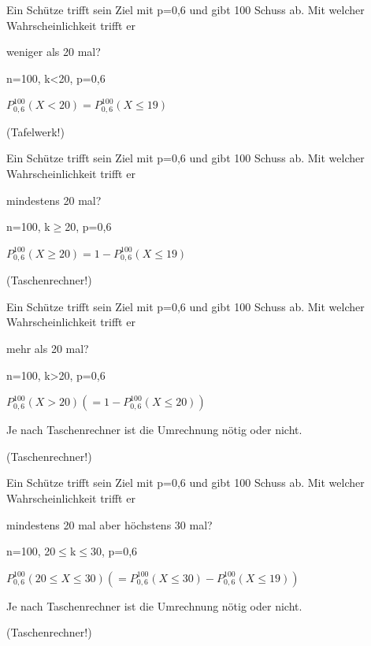 \documentclass[paper=a6,landscape,ngerman,twoside=true,fontsize=12pt]{scrartcl}
\begin{document}
\begin{frage}
	\large
	Ein Schütze trifft sein Ziel mit p=0,6 und gibt 100 Schuss ab. Mit welcher Wahrscheinlichkeit trifft er 
	
	\LARGE 
	weniger als 20 mal?
	
\end{frage}
\begin{antwort}
	n=100, k<20, p=0,6
	
	\bigskip
	$P^{100}_{0,6}(X<20)=P^{100}_{0,6}(X\leq19)$
	
	(Tafelwerk!)
	
\end{antwort}
\begin{frage}
	\large
	Ein Schütze trifft sein Ziel mit p=0,6 und gibt 100 Schuss ab. Mit welcher Wahrscheinlichkeit trifft er 
	
	\LARGE 
	mindestens 20 mal?
	
\end{frage}
\begin{antwort}
	n=100, k$\geq$20, p=0,6
	
	\bigskip
	$P^{100}_{0,6}(X\geq 20)=1-P^{100}_{0,6}(X\leq 19)$
	
	 (Taschenrechner!)
	
\end{antwort}
\begin{frage}
	\large
	Ein Schütze trifft sein Ziel mit p=0,6 und gibt 100 Schuss ab. Mit welcher Wahrscheinlichkeit trifft er 
	
	\LARGE 
	mehr als 20 mal?
	
\end{frage}
\begin{antwort}
	n=100, k>20, p=0,6
	
	\bigskip
	$P^{100}_{0,6}(X>20)(=1-P^{100}_{0,6}(X\leq 20))$
	
	Je nach Taschenrechner ist die Umrechnung nötig oder nicht.
	
	(Taschenrechner!)
	
\end{antwort}
\begin{frage}
	\large
	Ein Schütze trifft sein Ziel mit p=0,6 und gibt 100 Schuss ab. Mit welcher Wahrscheinlichkeit trifft er 
	
	\LARGE 
	mindestens 20 mal aber höchstens 30 mal?
	
\end{frage}
\begin{antwort}
	n=100, 20$\leq$k$\leq$30, p=0,6
	
	\bigskip\large
	$P^{100}_{0,6}(20\leq X \leq30)(=P^{100}_{0,6}(X\leq30)-P^{100}_{0,6}(X\leq19))$
	
	Je nach Taschenrechner ist die Umrechnung nötig oder nicht.

	(Taschenrechner!)
\end{antwort}
\end{document}
